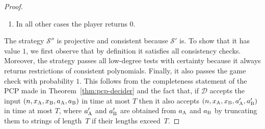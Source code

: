 \documentclass[11pt]{article}
\theoremstyle{definition}
\newcommand{\F}{\ensuremath{\mathbb{F}}}
\newcommand{\decider}{\mathcal{D}}
\newcommand{\strategy}{\mathscr{S}}
\newcommand{\gamestyle}[1]{\ensuremath{\textsc{#1}}\xspace}
\newcommand{\ora}{\gamestyle{Orac}}
\newcommand{\labelstyle}[1]{\ensuremath{\textsc{#1}}\xspace}
\newcommand{\tvarstyle}[1]{\mathsf{#1}}
\newcommand{\tvar}{\ensuremath{\tvarstyle{t}}}
\newcommand{\alice}{\labelstyle{A}}
\newcommand{\bob}{\labelstyle{B}}
\newcommand{\oracle}{\labelstyle{Oracle}}
\newcommand{\typestyle}[1]{\ensuremath{\textsc{#1}}\xspace}
\newcommand{\Plane}{\typestyle{Plane}}
\newcommand{\Point}{\typestyle{Point}}
\begin{document}
\begin{proof}
\begin{enumerate}
\begin{enumerate}
      If $\tvar_Q=\oracle$, for $v \in \{\alice, \bob\}$ the player computes
      questions $x_v = L^{v}(x_Q)$, as in  of
      $\decider^\ora$.
      The player parses $a_Q$ as a pair $(a_\alice, a_\bob)$.
      Let $a_\alice' = a_\alice$ if $a_\alice$ has length at most~$T$, and let
      $a_\alice'$ be the truncation of~$a_\alice$ to its first~$T$ symbols
      otherwise.
      Let $\ell_{\alice} \leq T$ be the length of~$a_\alice'$, and set
      \begin{equation*}
        a_\alice'' = \mathrm{enc}_\Gamma(a_\alice', \sqcup^{L/2 - \ell_{\alice}}).
      \end{equation*}
      Define $a_\bob''$ similarly.
      The player computes a PCP proof $\Pi=(g_1, \dots, g_5, c_0, \dots, c_{m'})$ as
      described in the completeness case of  for the tuple
      $(\decider, n, T, x_\alice, x_\bob)$, where the polynomials $g_1, g_2$ are
      low-degree encodings of $a_\alice''$ and $a_\bob''$, respectively.
      \begin{enumerate}
      \item If $\tvar_\Pi \in \{\Point_i, \Plane_i\}$ for $i \in \{1, \dots,
        5\}$, the player returns the restriction of $g_i$ to the subspace of
        $\F_q^{m}$ specified by $x_\Pi$.
      \item If $\tvar_\Pi \in \{\Point_6, \Plane_6\}$, the player returns the
        restriction of all the polynomials $g_1, \dots, g_5,$ $c_0, \dots,
        c_{m'}$ to the subspace of $\F_q^{m'}$ specified by $x_\Pi$.
      \end{enumerate}
    \item In all other cases the player returns $0$.
    \end{enumerate}
  \end{enumerate}
  The strategy $\strategy''$ is projective and consistent because $\strategy'$
  is.
  To show that it has value $1$, we first observe that by definition it
  satisfies all consistency checks.
  Moreover, the strategy passes all low-degree tests with certainty because it
  always returns restrictions of consistent polynomials.
  Finally, it also passes the game check with probability $1$.
  This follows from the completeness statement of the PCP made in
  Theorem~\ref{thm:pcp-decider} and the fact that, if $\decider$ accepts the
  input $(n, x_\alice,x_\bob, a_\alice,a_\bob)$ in time at most $T$ then it also
  accepts $(n, x_\alice,x_\bob, a'_\alice,a'_\bob)$ in time at most $T$, where
  $a'_\alice$ and $a'_\bob$ are obtained from $a_\alice$ and $a_\bob$ by
  truncating them to strings of length~$T$ if their lengths exceed~$T$.


\end{proof}
\end{document}
